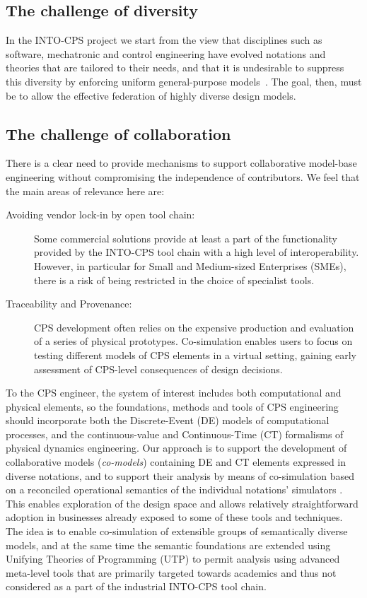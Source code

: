 \subsection{The challenge of diversity}

In the INTO-CPS project we start from the view that disciplines such as software, mechatronic and control engineering have evolved notations and theories that are tailored to their needs, and that it is undesirable to suppress this diversity by enforcing uniform general-purpose models~\cite{Fitzgerald&15,Larsen&16e}. The goal, then, must be to allow the effective federation of highly diverse design models.

\subsection{The challenge of collaboration}

There is a clear need to provide mechanisms to support collaborative model-base engineering without compromising the independence of contributors. We feel that the main areas of relevance here are:

\begin{description}
\item[Avoiding vendor lock-in by open tool chain:] Some commercial solutions provide at least a part of the functionality provided by the INTO-CPS tool chain with a high level of interoperability. However, in particular for Small and Medium-sized Enterprises (SMEs), there is a risk of being restricted in the choice of specialist tools.
\item[Traceability and Provenance:] CPS development often relies on the expensive production and evaluation of a series of physical prototypes. Co-simulation enables users to focus on testing different models of CPS elements in a virtual setting, gaining early assessment of CPS-level consequences of design decisions.
\end{description}



To the CPS engineer, the system of interest includes both computational and physical elements, so the foundations, methods and tools of CPS engineering should incorporate both the Discrete-Event (DE) models of computational processes, and the continuous-value and Continuous-Time (CT) formalisms of physical dynamics engineering. Our approach is to support the development of collaborative models (\emph{co-models}) containing DE and CT elements expressed in diverse notations, and to support their analysis by means of co-simulation based on a reconciled operational semantics of the individual notations' simulators \cite{Fitzgerald&14c}. This enables exploration of the design space and allows relatively straightforward adoption in businesses already exposed to some of these tools and techniques. The idea is to enable co-simulation of extensible groups of semantically diverse models, and at the same time the semantic foundations are extended using Unifying Theories of Programming (UTP) to permit analysis using advanced meta-level tools that are primarily targeted towards academics and thus not considered as a part of the industrial INTO-CPS tool chain.

